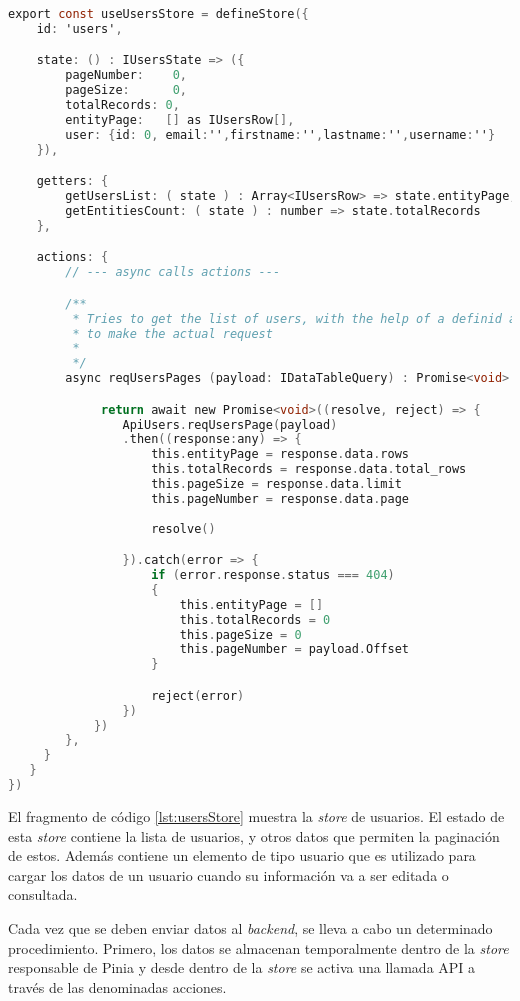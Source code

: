\begin{lstlisting}[language=C,caption={Store de usuarios}, label={lst:usersStore}]
export const useUsersStore = defineStore({
    id: 'users',

    state: () : IUsersState => ({
        pageNumber:    0,
        pageSize:      0,
        totalRecords: 0,
        entityPage:   [] as IUsersRow[],
        user: {id: 0, email:'',firstname:'',lastname:'',username:''} 
    }),

    getters: {
        getUsersList: ( state ) : Array<IUsersRow> => state.entityPage,
        getEntitiesCount: ( state ) : number => state.totalRecords
    },

    actions: {
        // --- async calls actions ---

        /**
         * Tries to get the list of users, with the help of a definid axios apis
         * to make the actual request
         *
         */
        async reqUsersPages (payload: IDataTableQuery) : Promise<void> {

             return await new Promise<void>((resolve, reject) => {
                ApiUsers.reqUsersPage(payload)
                .then((response:any) => {
                    this.entityPage = response.data.rows                  
                    this.totalRecords = response.data.total_rows
                    this.pageSize = response.data.limit
                    this.pageNumber = response.data.page
                    
                    resolve()

                }).catch(error => {
                    if (error.response.status === 404)
                    {
                        this.entityPage = []
                        this.totalRecords = 0
                        this.pageSize = 0
                        this.pageNumber = payload.Offset
                    }

                    reject(error)
                })
            })
        },
     }
   }
})
\end{lstlisting}

El fragmento de código \ref{lst:usersStore} muestra la \textit{store} de usuarios. El estado de esta \textit{store} contiene la lista de usuarios, y otros datos que permiten la paginación de estos. Además contiene un elemento de tipo usuario que es utilizado para cargar los datos de un usuario cuando su información va a ser editada o consultada.

Cada vez que se deben enviar datos al \textit{backend}, se lleva a cabo un determinado procedimiento. Primero, los datos se almacenan temporalmente dentro de la \textit{store} responsable de Pinia y desde dentro de la \textit{store} se activa una llamada API a través de las denominadas acciones.




